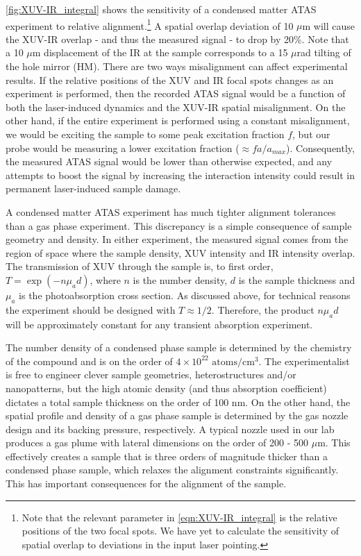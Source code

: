 \cref{fig:XUV-IR_integral} shows the sensitivity of a condensed matter ATAS experiment to relative alignment.\footnote{Note that the relevant parameter in \cref{eqn:XUV-IR_integral} is the relative positions of the two focal spots. We have yet to calculate the sensitivity of spatial overlap to deviations in the input laser pointing.} A spatial overlap deviation of 10 $\mu$m will cause the XUV-IR overlap - and thus the measured signal - to drop by 20\%. Note that a 10 $\mu$m displacement of the IR at the sample corresponds to a 15 $\mu$rad tilting of the hole mirror (HM). There are two ways misalignment can affect experimental results. If the relative positions of the XUV and IR focal spots changes as an experiment is performed, then the recorded ATAS signal would be a function of both the laser-induced dynamics and the XUV-IR spatial misalignment. On the other hand, if the entire experiment is performed using a constant misalignment, we would be exciting the sample to some peak excitation fraction $f$, but our probe would be measuring a lower excitation fraction ($\approx f a / a_{max}$). Consequently, the measured ATAS signal would be lower than otherwise expected, and any attempts to boost the signal by increasing the interaction intensity could result in permanent laser-induced sample damage.

A condensed matter ATAS experiment has much tighter alignment tolerances than a gas phase experiment. This discrepancy is a simple consequence of sample geometry and density. In either experiment, the measured signal comes from the region of space where the sample density, XUV intensity and IR intensity overlap. The transmission of XUV through the sample is, to first order, $T= \exp(- n \mu_a d)$, where $n$ is the number density, $d$ is the sample thickness and $\mu_a$ is the photoabsorption cross section. As discussed above, for technical reasons the experiment should be designed with $T \approx 1/2$. Therefore, the product $n \mu_a d$ will be approximately constant for any transient absorption experiment.

The number density of a condensed phase sample is determined by the chemistry of the compound and is on the order of $4 \times 10^{22} \text{ atoms}/\text{cm}^3$. The experimentalist is free to engineer clever sample geometries, heterostructures and/or nanopatterns, but the high atomic density (and thus absorption coefficient) dictates a total sample thickness on the order of 100 nm. On the other hand, the spatial profile and density of a gas phase sample is determined by the gas nozzle design and its backing pressure, respectively. A typical nozzle used in our lab produces a gas plume with lateral dimensions on the order of 200 - 500 $\mu$m. This effectively creates a sample that is three orders of magnitude thicker than a condensed phase sample, which relaxes the alignment constraints significantly. This has important consequences for the alignment of the sample.

